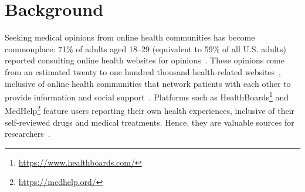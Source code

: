 \documentclass{bmcart}
\begin{document}
\begin{frontmatter}
\begin{abstractbox}

\end{abstractbox}
%

\end{frontmatter}




\section{Background}

Seeking medical opinions from online health communities has become commonplace: 71\% of adults aged 18--29 (equivalent to 59\% of all
U.S. adults) reported consulting online health
websites for opinions~\cite{fox2013health}.  These opinions come from an estimated
twenty to one hundred thousand health-related
websites~\cite{diaz2002patients}, inclusive of online health
communities that network patients with each other to provide
information and social support~\cite{johnston2013online}.  Platforms
such as
HealthBoards\footnote{\scriptsize{\url{https://www.healthboards.com/}}}
and MedHelp\footnote{{\scriptsize{\url{https://medhelp.ord/}}}}
feature users reporting their own health experiences, inclusive of
their self-reviewed drugs and medical treatments.  Hence, they are
valuable sources for researchers~\cite{leyens2017use,martin2014big}.
\end{document}
